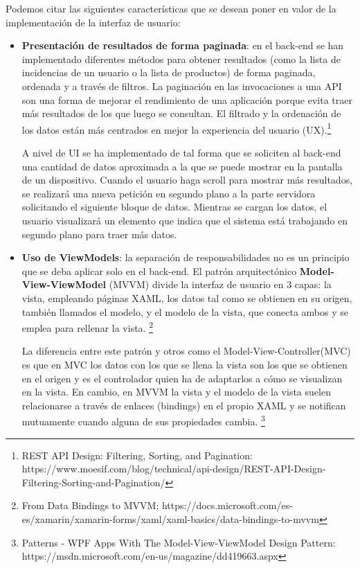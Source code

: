 \documentclass[11pt,spanish,listoffigures]{tfgetsinf}
\begin{document}
Podemos citar las siguientes características que se desean poner en valor de la implementación de la interfaz de usuario:

\begin{itemize}

\item \textbf{Presentación de resultados de forma paginada}: en el back-end se han implementado diferentes métodos para obtener resultados (como la lista de incidencias de un usuario o la lista de productos) de forma paginada, ordenada y a través de filtros. La paginación en las invocaciones a una API son una forma de mejorar el rendimiento de una aplicación porque evita traer más resultados de los que luego se consultan. El filtrado y la ordenación de los datos están más centrados en mejor la experiencia del usuario (UX).\footnote{ REST API Design: Filtering, Sorting, and Pagination: https://www.moesif.com/blog/technical/api-design/REST-API-Design-Filtering-Sorting-and-Pagination/} 

A nivel de UI se ha implementado de tal forma que se soliciten al back-end una cantidad de datos aproximada a la que se puede mostrar en la pantalla de un dispositivo. Cuando el usuario haga scroll para mostrar más resultados, se realizará una nueva petición en segundo plano a la parte servidora solicitando el siguiente bloque de datos. Mientras se cargan los datos, el usuario visualizará un elemento que indica que el sistema está trabajando en segundo plano para traer más datos.


\item \textbf{Uso de ViewModels}: la separación de responsabilidades no es un principio que se deba aplicar solo en el back-end. El patrón arquitectónico \textbf{Model-View-ViewModel} (MVVM) divide la interfaz de usuario en 3 capas: la vista, empleando páginas XAML, los datos tal como se obtienen en su origen, también llamados el modelo, y el modelo de la vista, que conecta ambos y se emplea para rellenar la vista. \footnote{From Data Bindings to MVVM: https://docs.microsoft.com/es-es/xamarin/xamarin-forms/xaml/xaml-basics/data-bindings-to-mvvm} 

La diferencia entre este patrón y otros como el Model-View-Controller(MVC) es que en MVC los datos con los que se llena la vista son los que se obtienen en el origen y es el controlador quien ha de adaptarlos a cómo se visualizan en la vista. En cambio, en MVVM la vista y el modelo de la vista suelen relacionarse a través de enlaces (bindings) en el propio XAML y se notifican mutuamente cuando alguna de sus propiedades cambia. \footnote{ Patterns - WPF Apps With The Model-View-ViewModel Design Pattern: https://msdn.microsoft.com/en-us/magazine/dd419663.aspx}


\end{itemize}
\end{document}
